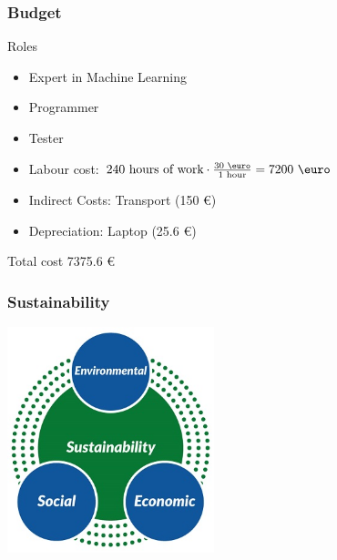 \documentclass{beamer}
\begin{document}
\begin{frame}
\frametitle{Budget}

\begin{block}{Roles}
\begin{itemize}
    \item Expert in Machine Learning
    \item Programmer
    \item Tester
\end{itemize}
\end{block}
\begin{itemize}
    \item Labour cost: \(240 \text{ hours of work} \cdot \frac{30 \text{ \euro}}{1 \text{ hour}} = 7200 \text{ \euro}\)
    \item Indirect Costs: Transport (150 \euro)
    \item Depreciation: Laptop (25.6 \euro)
\end{itemize}

\begin{block}{Total cost}
    7375.6 \euro
\end{block}
\end{frame}


\begin{frame}
\frametitle{Sustainability}
\begin{center}
\includegraphics[width=0.45\textwidth]{sustan}
\end{center}

\end{frame}
\end{document}
